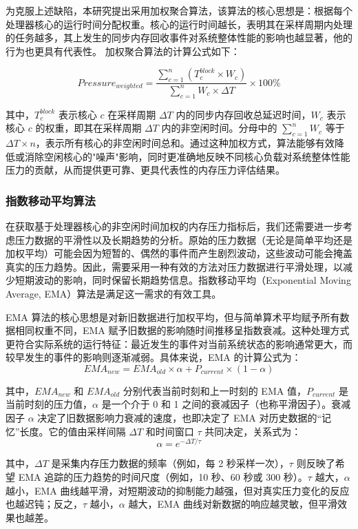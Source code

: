 为克服上述缺陷，本研究提出采用加权聚合算法，该算法的核心思想是：根据每个处理器核心的运行时间分配权重。核心的运行时间越长，表明其在采样周期内处理的任务越多，其上发生的同步内存回收事件对系统整体性能的影响也越显著，他的行为也更具有代表性。 加权聚合算法的计算公式如下：

\[
Pressure_{weighted} = \frac{\sum_{c=1}^{n} (T_c^{block} \times W_c)}{\sum_{c=1}^{n} W_c \times \Delta T} \times 100\%
\]

其中，\(T_c^{block}\) 表示核心 \(c\) 在采样周期 \(\Delta T\) 内的同步内存回收总延迟时间，\(W_c\) 表示核心 \(c\) 的权重，即其在采样周期 \(\Delta T\) 内的非空闲时间。分母中的 \(\sum_{c=1}^{n} W_c\) 等于 \(\Delta T \times n\)，表示所有核心的非空闲时间总和。通过这种加权方式，算法能够有效降低或消除空闲核心的"噪声"影响，同时更准确地反映不同核心负载对系统整体性能压力的贡献，从而提供更可靠、更具代表性的内存压力评估结果。

\subsubsection{指数移动平均算法}

在获取基于处理器核心的非空闲时间加权的内存压力指标后，我们还需要进一步考虑压力数据的平滑性以及长期趋势的分析。原始的压力数据（无论是简单平均还是加权平均）可能会因为短暂的、偶然的事件而产生剧烈波动，这些波动可能会掩盖真实的压力趋势。因此，需要采用一种有效的方法对压力数据进行平滑处理，以减少短期波动的影响，同时保留长期趋势信息。指数移动平均（Exponential Moving Average, EMA）算法是满足这一需求的有效工具。

EMA 算法的核心思想是对新旧数据进行加权平均，但与简单算术平均赋予所有数据相同权重不同，EMA 赋予旧数据的影响随时间推移呈指数衰减。这种处理方式更符合实际系统的运行特征：最近发生的事件对当前系统状态的影响通常更大，而较早发生的事件的影响则逐渐减弱。具体来说，EMA 的计算公式为：
\[
EMA_{new} = EMA_{old} \times \alpha + P_{current} \times (1 - \alpha)
\]

其中，\(EMA_{new}\) 和 \(EMA_{old}\) 分别代表当前时刻和上一时刻的 EMA 值，\(P_{current}\) 是当前时刻的压力值，\(\alpha\) 是一个介于 0 和 1 之间的衰减因子（也称平滑因子）。衰减因子 \(\alpha\) 决定了旧数据影响力衰减的速度，也即决定了 EMA 对历史数据的“记忆”长度。它的值由采样间隔 \(\Delta T\) 和时间窗口 \(\tau\) 共同决定，关系式为：
\[
\alpha = e^{-\Delta T / \tau}
\]

其中，\(\Delta T\) 是采集内存压力数据的频率（例如，每 2 秒采样一次），\(\tau\) 则反映了希望 EMA 追踪的压力趋势的时间尺度（例如，10 秒、60 秒或 300 秒）。\(\tau\) 越大，\(\alpha\) 越小，EMA 曲线越平滑，对短期波动的抑制能力越强，但对真实压力变化的反应也越迟钝；反之，\(\tau\) 越小，\(\alpha\) 越大，EMA 曲线对新数据的响应越灵敏，但平滑效果也越差。

